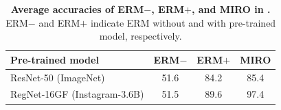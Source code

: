 \begin{table}
\centering
\centering
\small
\caption{\small {\bf Average accuracies of ERM$-$, ERM$+$, and MIRO in \pacs{}.} ERM$-$ and ERM$+$ indicate ERM without and with pre-trained model, respectively.}
\label{table:mi_acc_corr}
\renewcommand{\arraystretch}{1.1}
\setlength{\tabcolsep}{4pt}
\begin{tabular}{l|ccc} 
\toprule
\textbf{Pre-trained model}             & \textbf{ERM$-$} & \textbf{ERM$+$} & \textbf{MIRO}  \\ \midrule
ResNet-50 \scriptsize{(ImageNet)}         & 51.6 & 84.2 & 85.4  \\
RegNet-16GF \scriptsize{(Instagram-3.6B)} & 51.5 & 89.6 & 97.4  \\
\bottomrule
\end{tabular}
\end{table}